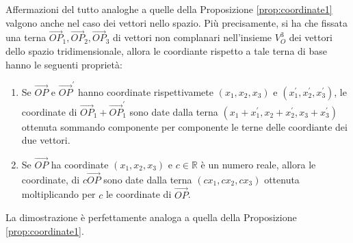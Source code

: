 \begin{oss}
  \label{oss:coordinate2}
  Affermazioni del tutto analoghe a quelle della Proposizione \ref{prop:coordinate1} valgono anche nel caso dei vettori nello spazio. Più precisamente, si ha che fissata una terna $\vec{OP}_1, \vec{OP}_2,\vec{OP}_3$ di vettori non complanari nell'insieme $V_O^3$ dei vettori dello spazio tridimensionale, allora le coordiante rispetto a tale terna di base hanno le seguenti proprietà:
  \begin{enumerate}
  \item Se $\vec{OP}$ e $\vec{OP}^\prime$ hanno coordinate rispettivamete $(x_1,x_2,x_3)$ e $(x_1^\prime,x_2^\prime,x_3^\prime)$, le coordinate di $\vec{OP}_1+\vec{OP}_1^\prime$ sono date dalla terna $(x_1+x_1^\prime,x_2+x_2^\prime,x_3+x_3^\prime)$ ottenuta sommando componente per componente le terne delle coordiante dei due vettori.
  \item Se $\vec{OP}$ ha coordinate $(x_1,x_2,x_3)$ e $c\in \mathds{R}$ è un numero reale, allora le coordinate, di $c\vec{OP}$ sono date dalla terna $(cx_1,cx_2,cx_3)$ ottenuta moltiplicando per $c$ le coordinate di $\vec{OP}$.
  \end{enumerate}
  La dimostrazione è perfettamente analoga a quella della Proposizione \ref{prop:coordinate1}.
\end{oss}
